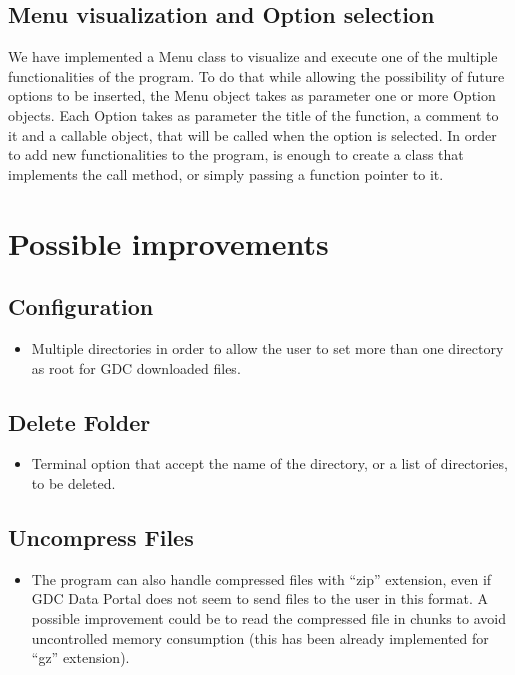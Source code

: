 \documentclass[hidelinks,12pt]{article}
\begin{document}

\subsection{Menu visualization and Option selection}
We have implemented a Menu class to visualize and execute one of the multiple functionalities of the program. To do that while
allowing the possibility of future options to be inserted, the Menu object takes as parameter one or more Option objects.
Each Option takes as parameter the title of the function, a comment to it and a callable object, that will be called when the option is selected. In order to add new functionalities to the program, is enough to create a class that implements the \underline{\hspace{0.4cm}}call\underline{\hspace{0.4cm}} method, or simply passing a function pointer to it. 


\section{Possible improvements}

\subsection{Configuration}
\begin{itemize}
\item Multiple directories in order to allow the user to set more than one directory as root for GDC downloaded files.
\end{itemize}

\subsection{Delete Folder}
\begin{itemize}
\item Terminal option  that accept the name of the directory, or a list of directories, to be deleted.
\end{itemize}

\subsection{Uncompress Files}
\begin{itemize}
\item The program can also handle compressed files with ``zip'' extension, even if GDC Data Portal does not seem to send files to the user in this format. A possible improvement could be to read the compressed file in chunks to avoid uncontrolled memory consumption (this has been already implemented for ``gz'' extension). 
\end{itemize}
\end{document}
